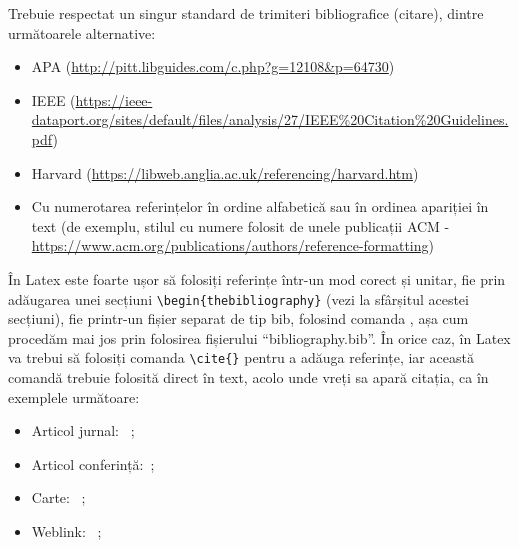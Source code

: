 Trebuie respectat un singur standard de trimiteri bibliografice (citare), dintre următoarele alternative:
\begin{itemize}
	\item APA (\url{http://pitt.libguides.com/c.php?g=12108\&p=64730})
	\item IEEE (\url{https://ieee-dataport.org/sites/default/files/analysis/27/IEEE\%20Citation\%20Guidelines.pdf}) 
	\item Harvard (\url{https://libweb.anglia.ac.uk/referencing/harvard.htm})
	\item Cu numerotarea referințelor în ordine alfabetică sau în ordinea apariției în text (de exemplu, stilul cu numere folosit de unele publicații ACM - \url{https://www.acm.org/publications/authors/reference-formatting}) 
\end{itemize}

În Latex este foarte ușor să folosiți referințe într-un mod corect și unitar, fie prin adăugarea unei secțiuni
\verb!\begin{thebibliography}!
(vezi la sfârșitul acestei secțiuni), fie printr-un fișier separat de tip bib, folosind comanda
\verb!!,
așa cum procedăm mai jos prin folosirea fișierului ``bibliography.bib''. În orice caz, în Latex va trebui să folosiți comanda
\verb!\cite{}!
pentru a adăuga referințe, iar această comandă trebuie folosită direct în text, acolo unde vreți sa apară citația, ca în exemplele următoare:
\begin{itemize}
	\item Articol jurnal: ~\cite{article};
	\item Articol conferință:~\cite{proc};
	\item Carte: ~\cite{book};
	\item Weblink: ~\cite{silva};
\end{itemize}